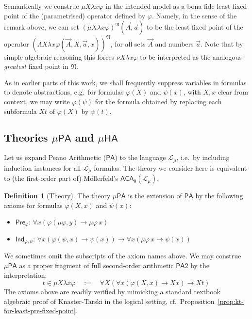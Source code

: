 \documentclass[10pt,a4paper]{amsart}
\theoremstyle{plain}
\theoremstyle{definition}
\newtheorem{definition}[definition]{Definition}
\newtheorem{convention}[convention]{Convention}
\renewcommand{\phi}{\varphi}
\newcommand{\anupam}[1]{\todo[color=green]{A: #1}}
\renewcommand{\todo}[1]{}
\renewcommand{\anupam}[1]{}
\theoremstyle{plain}
\theoremstyle{definition} %
\newcommand{\limp}{\to}
\newcommand{\mufo}[3]{\mu #1 \lambda #2 #3}
\newcommand{\nufo}[3]{\nu #1 \lambda #2 #3}
\newcommand{\Lang}{\mathcal L}
\newcommand{\lang}[1]{\Lang_{#1}}
\newcommand{\langmuarith}{\lang \mu}
\newcommand{\PA}{\mathsf{PA}}
\newcommand{\HA}{\mathsf{HA}}
\newcommand{\muPA}{\mu\PA}
\newcommand{\muHA}{\mu\HA}
\newcommand{\SOPA}{\PA2}
\newcommand{\preaxiom}{\mathsf{Pre}}
\newcommand{\indaxiom}{\mathsf{Ind}}
\newcommand{\ACA}{\mathsf{ACA}_0}
\newcommand{\nmod}{\mathfrak N}
\begin{document}
Semantically we construe $\mufo X x \phi$ in the intended model as a bona fide least fixed point of the (parametrised) operator defined by $\phi$. 
Namely, in the sense of the remark above, we can set $(\mufo X x \phi)^\nmod (\vec A,\vec a)$ to be the least fixed point of the operator $(\Lambda X \lambda x \phi(\vec A, X, \vec a, x))^\nmod$, for all sets $\vec A$ and numbers $\vec a$.
Note that by simple algebraic reasoning this forces $\nufo X x \phi$ to be interpreted as the analogous \emph{greatest} fixed point in $\nmod$.
\anupam{this is a bit brief, but is fine for now}

As in earlier parts of this work, we shall frequently suppress variables in formulas to denote abstractions, e.g.\ for formulas $\phi(X)$ and $\psi(x)$, with $X,x$ clear from context, we may write $\phi(\psi)$ for the formula obtained by replacing each subformula $Xt$ of $\phi(X)$ by $\psi(t)$.

\subsection{Theories $\muPA$ and $\muHA$}
Let us expand Peano Arithmetic ($\PA$) to the language $\langmuarith$, i.e.\ by including induction instances for all $\langmuarith$-formulas.
The theory we consider here is equivalent to (the first-order part of) M\"ollerfeld's $\ACA(\langmuarith)$.

\begin{definition}
    [Theory]
    \label{def:muPA}
    The theory $\muPA$ is the extension of $\PA$ by the following axioms for formulas $\phi(X,x)$ and $\psi(x)$:
    \begin{itemize}
        \item $\preaxiom_\phi$: $\forall x (\phi(\mu \phi, y) \limp \mu \phi\,  x)$
        \item $\indaxiom_{\phi,\psi}$: $\forall x (\phi(\psi, x) \limp \psi(x)) \limp \forall x (\mu \phi\, x  \limp \psi(x))$
    \end{itemize}
\end{definition}


We sometimes omit the subscripts of the axiom names above.
We may construe $\muPA$ as a proper fragment of full second-order arithmetic $\SOPA$ by the interpretation:
\begin{equation}
    \label{eq:mufo-as-so-int-pre}
    t \in \mufo X x \phi 
    \quad := \quad
    \forall X (\forall x (\phi(X,x) \limp Xx) \limp Xt)
\end{equation}
The axioms above are readily verified by mimicking a standard textbook algebraic proof of Knaster-Tarski in the logical setting, cf.~Proposition~\ref{prop:kt-for-least-pre-fixed-point}.
\end{document}
